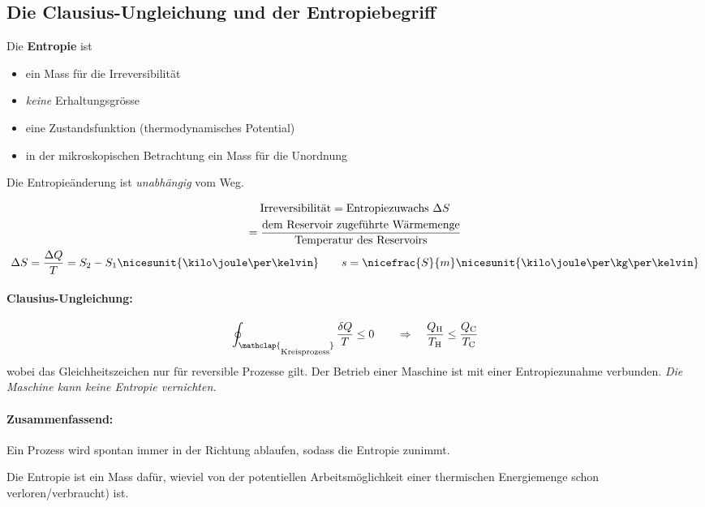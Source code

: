 	\subsection{Die Clausius-Ungleichung und der Entropiebegriff} %
		Die \textbf{Entropie} ist
		\begin{itemize}
			\item ein Mass für die Irreversibilität
			\item \emph{keine} Erhaltungsgrösse
			\item eine Zustandsfunktion (thermodynamisches Potential)
			\item in der mikroskopischen Betrachtung ein Mass für die Unordnung
		\end{itemize}
		Die Entropieänderung ist \emph{unabhängig} vom Weg.
		
		\begin{gather*}
			\text{Irreversibilität} = \text{Entropiezuwachs } \Delta S \\
			= \frac{\text{dem Reservoir zugeführte Wärmemenge}}{\text{Temperatur des Reservoirs}} \\
			\Delta S = \frac{\Delta Q}{T} = S_2 - S_1 \nicesunit{\kilo\joule\per\kelvin} \qquad
			s = \nicefrac{S}{m} \nicesunit{\kilo\joule\per\kg\per\kelvin}
		\end{gather*}
		
		\paragraph{Clausius-Ungleichung:} %
			\[
				\oint_{\mathclap{\text{\raisebox{-2mm}{Kreisprozess}}}} \frac{\delta Q}{T} \leq 0 \qquad \Rightarrow \quad
				\frac{Q_\text{H}}{T_\text{H}} \leq \frac{Q_\text{C}}{T_\text{C}}
			\]
			wobei das Gleichheitszeichen nur für reversible Prozesse gilt.
			Der Betrieb einer Maschine ist mit einer Entropiezunahme verbunden.
			\emph{Die Maschine kann keine Entropie vernichten.}
		
		\paragraph{Zusammenfassend:} %
			Ein Prozess wird spontan immer in der Richtung ablaufen, sodass die Entropie zunimmt.
			
			Die Entropie ist ein Mass dafür, wieviel von der potentiellen Arbeitsmöglichkeit einer thermischen Energiemenge schon verloren/verbraucht) ist.
	
